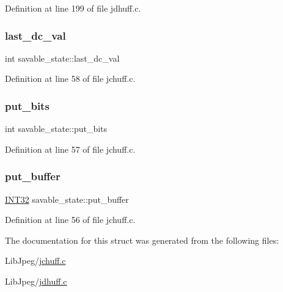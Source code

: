 Definition at line 199 of file jdhuff.\+c.

\mbox{\label{structsavable__state_a828b78727611f4ff5353d24cf7230d85}} 
\subsubsection{\texorpdfstring{last\_dc\_val}{last\_dc\_val}}
{\footnotesize\ttfamily int savable\+\_\+state\+::last\+\_\+dc\+\_\+val}



Definition at line 58 of file jchuff.\+c.

\mbox{\label{structsavable__state_a767d7a21d1bd5bee01108b947bfc9fbf}} 
\subsubsection{\texorpdfstring{put\_bits}{put\_bits}}
{\footnotesize\ttfamily int savable\+\_\+state\+::put\+\_\+bits}



Definition at line 57 of file jchuff.\+c.

\mbox{\label{structsavable__state_a71fdab6bc3ab791e85f61179045da4dd}} 
\subsubsection{\texorpdfstring{put\_buffer}{put\_buffer}}
{\footnotesize\ttfamily \mbox{\hyperlink{jmorecfg_8h_a0cb58e7e6f0bad369840a52e54a56ae0}{I\+N\+T32}} savable\+\_\+state\+::put\+\_\+buffer}



Definition at line 56 of file jchuff.\+c.



The documentation for this struct was generated from the following files\+:\begin{DoxyCompactItemize}
\item 
Lib\+Jpeg/\mbox{\hyperlink{jchuff_8c}{jchuff.\+c}}\item 
Lib\+Jpeg/\mbox{\hyperlink{jdhuff_8c}{jdhuff.\+c}}\end{DoxyCompactItemize}
